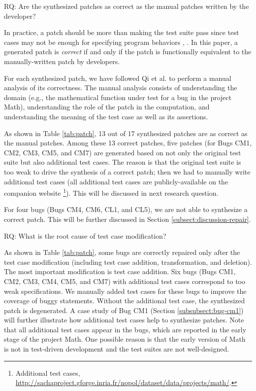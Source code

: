 \medskip
\begin{mdframed}
RQ\label{rq-correct}: Are the synthesized patches as correct as the manual patches written by the developer?
\end{mdframed}

In practice, a patch should be more than making the test suite pass since test cases may not be enough for specifying program behaviors \cite{monperrus2014critical}, \cite{qi2015efficient}. 
In this paper, a generated patch is \textit{correct} if and only if the patch is functionally equivalent to the manually-written patch by developers.

For each synthesized patch, we have followed Qi et al. \cite{qi2015efficient} to perform a manual analysis of its correctness. 
The manual analysis consists of understanding the domain (e.g., the mathematical function under test for a bug in the project Math), understanding the role of the patch in the computation, and understanding the meaning of the test case as well as its assertions. 

As shown in Table \ref{tab:patch}, 13 out of 17 synthesized patches are as correct as the manual patches. Among these 13 correct patches, five patches (for Bugs CM1, CM2, CM3, CM5, and CM7) are generated based on not only the original test suite but also additional test cases. The reason is that the original test suite is too weak to drive the synthesis of a correct patch; then we had to manually write additional test cases (all additional test cases are publicly-available on the companion website \cite{nopol2014}\footnote{Additional test cases, \url{http://sachaproject.gforge.inria.fr/nopol/dataset/data/projects/math/}.}). This will be discussed in next research question. 

For four bugs (Bugs CM4, CM6, CL1, and CL5), we are not able to synthesize a correct patch. This will be further discussed in Section \ref{subsect:discussion-repair}. 

\medskip
\begin{mdframed}
RQ\label{rq-testcase}: What is the root cause of test case modification?
\end{mdframed}

As shown in Table \ref{tab:patch}, some bugs are correctly repaired only after the test case modification (including test case addition, transformation, and deletion).  
The most important modification is test case addition. 
Six bugs (Bugs CM1, CM2, CM3, CM4, CM5, and CM7) with additional test cases correspond to too weak specifications. 
We manually added test cases for these bugs to improve the coverage of buggy statements. 
Without the additional test case, the synthesized patch is degenerated.
A case study of Bug CM1 (Section \ref{subsubsect:bug-cm1}) will further illustrate how additional test cases help to synthesize patches. 
Note that all additional test cases appear in the bugs, which are reported in the early stage of the project Math. One possible reason is that the early version of Math is not in test-driven development and the test suites are not well-designed. 

